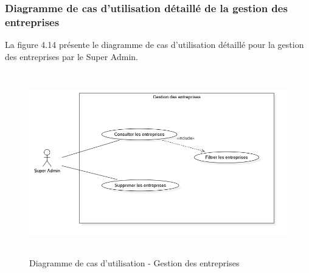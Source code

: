 \subsubsection{Diagramme de cas d'utilisation détaillé de la gestion des entreprises}
\noindent La figure 4.14 présente le diagramme de cas d'utilisation détaillé pour la gestion des entreprises par le Super Admin.

\begin{figure}[H]
    \centering
    \includegraphics[width=12cm,height=8cm]{images/gestioncompanyuc.png}
    \caption{Diagramme de cas d'utilisation - Gestion des entreprises}
\end{figure}


